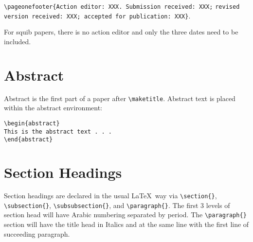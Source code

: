\documentclass{clv3}
\begin{document}
\noindent \verb|\pageonefooter{Action editor: XXX. Submission received: XXX;| \newline \hspace*{1em} \verb|revised version received: XXX; accepted for publication: XXX}|. %

\noindent For squib papers, there is no action editor and only the three dates need to be included.

\section{Abstract}

Abstract is the first part of a paper after \verb|\maketitle|. Abstract text is 
placed within the abstract environment:

\begin{verbatim}
\begin{abstract}
This is the abstract text . . .
\end{abstract}
\end{verbatim}

\section{Section Headings}

Section headings are declared in the usual \LaTeX\ way via \verb|\section{}|, 
\verb|\subsection{}|, \verb|\subsubsection{}|, and \verb|\paragraph{}|. The 
first 3 levels of section head will have Arabic numbering separated 
by period. The \verb|\paragraph{}| section will have the title head in Italics 
and at the same line with the first line of succeeding paragraph.
\end{document}
